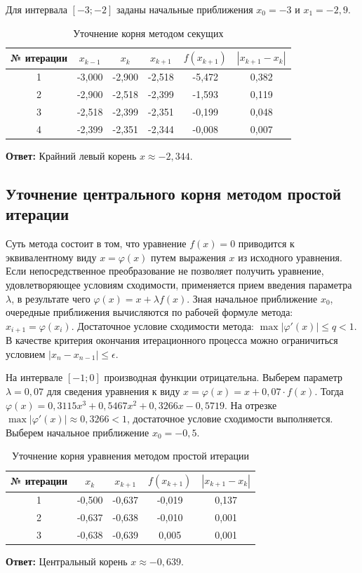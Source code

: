 \documentclass[a4paper,12pt]{article}
\begin{document}
Для интервала $[-3; -2]$ заданы начальные приближения $x_0 = -3$ и $x_1 = -2,9$.

\begin{table}[H]
\centering
\begin{tabular}{|c|c|c|c|c|c|}
\hline
№ итерации & $x_{k-1}$ & $x_k$ & $x_{k+1}$ & $f(x_{k+1})$ & $|x_{k+1}-x_k|$ \\ \hline
1 & -3,000 & -2,900 & -2,518 & -5,472 & 0,382 \\ \hline
2 & -2,900 & -2,518 & -2,399 & -1,593 & 0,119 \\ \hline
3 & -2,518 & -2,399 & -2,351 & -0,199 & 0,048 \\ \hline
4 & -2,399 & -2,351 & -2,344 & -0,008 & 0,007 \\ \hline
\end{tabular}
\caption{Уточнение корня методом секущих}
\end{table}
\textbf{Ответ:} Крайний левый корень $x \approx -2,344$.

\subsection{Уточнение центрального корня методом простой итерации}

Суть метода состоит в том, что уравнение $f(x) = 0$ приводится к эквивалентному виду $x = \varphi(x)$ путем выражения $x$ из исходного уравнения. Если непосредственное преобразование не позволяет получить уравнение, удовлетворяющее условиям сходимости, применяется прием введения параметра $\lambda$, в результате чего $\varphi(x) = x + \lambda f(x)$. Зная начальное приближение $x_0$, очередные приближения вычисляются по рабочей формуле метода: $x_{i+1} = \varphi(x_i)$. Достаточное условие сходимости метода: $\max |\varphi'(x)| \le q < 1$. В качестве критерия окончания итерационного процесса можно ограничиться условием $|x_n - x_{n-1}| \le \epsilon$.

На интервале $[-1; 0]$ производная функции отрицательна. Выберем параметр $\lambda = 0,07$ для сведения уравнения к виду $x = \varphi(x) = x + 0,07 \cdot f(x)$.
Тогда $\varphi(x) = 0,3115x^3 + 0,5467x^2 + 0,3266x - 0,5719$.
На отрезке $\max |\varphi'(x)| \approx 0,3266 < 1$, достаточное условие сходимости выполняется. Выберем начальное приближение $x_0 = -0,5$.

\begin{table}[H]
\centering
\begin{tabular}{|c|c|c|c|c|}
\hline
№ итерации & $x_k$ & $x_{k+1}$ & $f(x_{k+1})$ & $|x_{k+1}-x_k|$ \\ \hline
1 & -0,500 & -0,637 & -0,019 & 0,137 \\ \hline
2 & -0,637 & -0,638 & -0,010 & 0,001 \\ \hline
3 & -0,638 & -0,639 & 0,005 & 0,001 \\ \hline
\end{tabular}
\caption{Уточнение корня уравнения методом простой итерации}
\end{table}
\textbf{Ответ:} Центральный корень $x \approx -0,639$.
\end{document}
